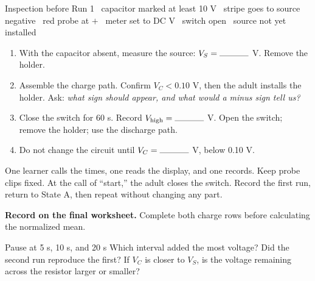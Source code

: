 \vspace{-4pt}
\begin{gate}{Inspection before Run 1}
\tickbox\ capacitor marked at least 10 V \quad
\tickbox\ stripe goes to source negative \quad
\tickbox\ red probe at \(+\) \quad
\tickbox\ meter set to DC V \quad
\tickbox\ switch open \quad
\tickbox\ source not yet installed
\end{gate}
\vspace{-5pt}


\begin{enumerate}
\item With the capacitor absent, measure the source:
  \(V_S=\writein{1.2cm}\) V. Remove the holder.
\item Assemble the charge path. Confirm \(V_C<0.10\) V, then the adult installs
  the holder. Ask: \emph{what sign should appear, and what would a minus sign
  tell us?}
\item Close the switch for 60 s. Record \(V_{\rm high}=\writein{1.2cm}\) V.
  Open the switch; remove the holder; use the discharge path.
\item Do not change the circuit until \(V_C=\writein{1.2cm}\) V, below 0.10 V.
\end{enumerate}

\endgroup
\newpage
\noindent\mbox{}\par\vspace{-\baselineskip}


One learner calls the times, one reads the display, and one records. Keep probe
clips fixed. At the call of “start,” the adult closes the switch. Record the
first run, return to State A, then repeat without changing any part.

\begin{telosframe}
\textbf{Record on the final worksheet.} Complete both charge rows before
calculating the normalized mean.
\end{telosframe}

\begin{telospanel}{Pause at 5 s, 10 s, and 20 s}
Which interval added the most voltage? \writein{2cm}\quad
Did the second run reproduce the first? \writein{2cm}\quad
If \(V_C\) is closer to \(V_S\), is the voltage remaining across the resistor
larger or smaller? \writein{2cm}
\end{telospanel}


